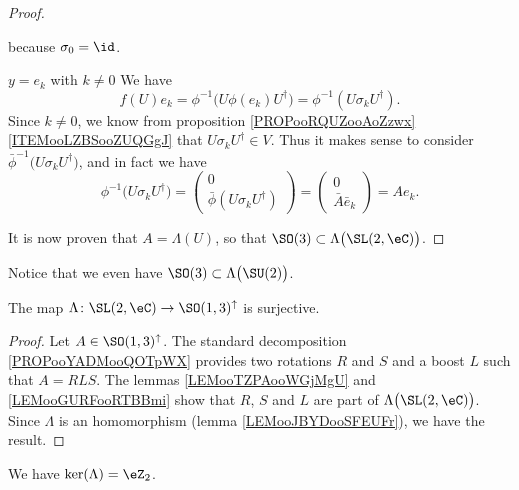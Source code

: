 \begin{proof}
\begin{subproof}
            because \( \sigma_0=\id\).
        \item[$ y=e_k$ with $ k\neq 0$]
            We have
            \begin{equation}
                f(U)e_k=\phi^{-1}\big( U\phi(e_k)U^{\dag} \big)=\phi^{-1}(U\sigma_k U^{\dag}).
            \end{equation}
            Since \( k\neq 0\), we know from proposition \ref{PROPooRQUZooAoZzwx}\ref{ITEMooLZBSooZUQGgJ} that \( U\sigma_k U^{\dag}\in V\). Thus it makes sense to consider \( \bar \phi^{-1}\big(U\sigma_k U^{\dag}\big)\), and in fact we have
            \begin{equation}
                \phi^{-1}\big( U\sigma_k U^{\dag} \big)=\begin{pmatrix}
                    0    \\ 
                    \bar\phi(U\sigma_kU^{\dag})    
                \end{pmatrix}=\begin{pmatrix}
                    0    \\ 
                    \bar A\bar e_k    
                \end{pmatrix}=Ae_k.
            \end{equation}
    \end{subproof}
    It is now proven that \( A=\Lambda(U)\), so that \( \SO(3)\subset \Lambda\big( \SL(2,\eC) \big)\).
\end{proof}
Notice that we even have \( \SO(3)\subset \Lambda\big( \SU(2) \big)\).

\begin{proposition}     \label{PROPooFPSLooSzvSYF}
    The map \( \Lambda\colon \SL(2,\eC)\to \SO(1,3)^{\uparrow}\) is surjective.
\end{proposition}

\begin{proof}
    Let \( A\in \SO(1,3)^{\uparrow}\). The standard decomposition \ref{PROPooYADMooQOTpWX} provides two rotations \( R\) and \( S\) and a boost \( L\) such that \( A=RLS\). The lemmas \ref{LEMooTZPAooWGjMgU} and \ref{LEMooGURFooRTBBmi} show that \( R\), \( S\) and \( L\) are part of \( \Lambda\big( \SL(2,\eC) \big)\). Since \( \Lambda\) is an homomorphism (lemma \ref{LEMooJBYDooSFEUFr}), we have the result.
\end{proof}

\begin{lemma}       \label{LEMooQKCQooTIaesa}
    We have \( \ker(\Lambda)=\eZ_2\).
\end{lemma}

